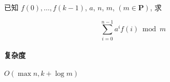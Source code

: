 已知 \(f(0),\dots,f(k-1)\), \(a\), \(n\), \(m\), \((m\in\mathbf{P})\), 求

\[
    \sum_{i=0}^{n-1} a^i f(i)\bmod{m}
\]

\paragraph{复杂度}

\(O(\max{n,k}+\log m)\)